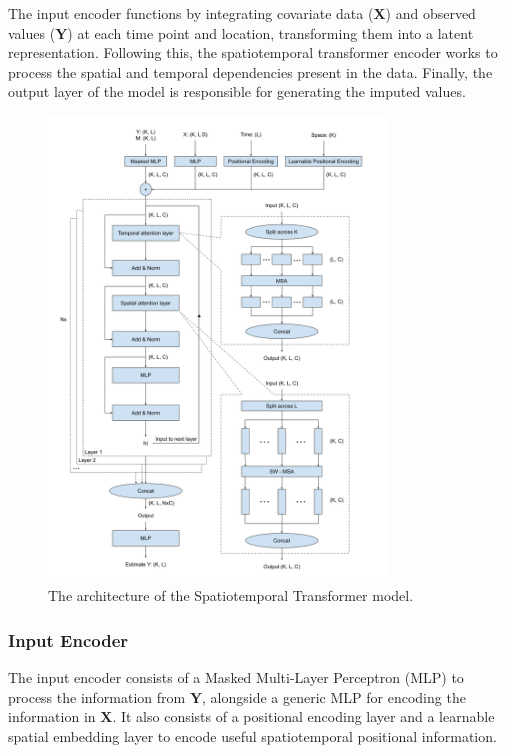 \documentclass[11pt]{article}
\begin{document}
The input encoder functions by integrating covariate data ($\boldsymbol{X}$) and observed values ($\boldsymbol{Y}$) at each time point and location, transforming them into a latent representation. Following this, the spatiotemporal transformer encoder works to process the spatial and temporal dependencies present in the data. Finally, the output layer of the model is responsible for generating the imputed values. 



\begin{figure}
\centering
\includegraphics[width=0.8\textwidth]{figure/st_transformer.png}
\caption{The architecture of the Spatiotemporal Transformer model.}
\label{fig: st_transformer}
\end{figure}




\subsubsection*{Input Encoder} 
The input encoder consists of a Masked Multi-Layer Perceptron (MLP) to process the information from $\boldsymbol{Y}$, alongside a generic MLP for encoding the information in $\boldsymbol{X}$. It also consists of a positional encoding layer and a learnable spatial embedding layer to encode useful spatiotemporal positional information.
\end{document}
